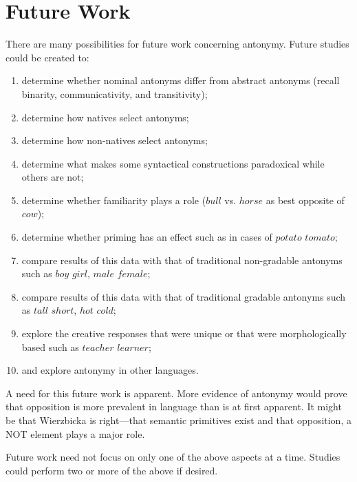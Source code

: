 \section {Future Work}
There are many possibilities for future work concerning antonymy.  Future studies could be created to:
	\begin {enumerate}
		\item determine whether nominal antonyms differ from abstract antonyms (recall binarity, communicativity, and transitivity);
		\item determine how natives select antonyms;
		\item determine how non-natives select antonyms;
		\item determine what makes some syntactical constructions paradoxical while others are not;
		\item determine whether familiarity plays a role ($bull$ vs. $horse$ as best opposite of $cow$);
		\item determine whether priming has an effect such as in cases of $potato$ \opp $tomato$;
		\item compare results of this data with that of traditional non-gradable antonyms such as $boy$ \opp $girl$, $male$ \opp $female$;
		\item compare results of this data with that of traditional gradable antonyms such as $tall$ \opp $short$, $hot$ \opp $cold$;
		\item explore the creative responses that were unique or that were morphologically based such as $teacher$ \opp $learner$;
		\item and explore antonymy in other languages.  
	\end {enumerate}
A need for this future work is apparent.  More evidence of antonymy would prove that opposition is more prevalent in language than is at first apparent.  It might be that Wierzbicka is right—that semantic primitives exist and that opposition, a NOT element plays a major role.

Future work need not focus on only one of the above aspects at a time.  Studies could perform two or more of the above if desired.

